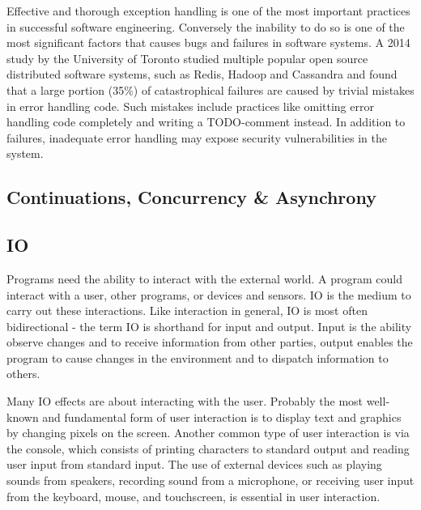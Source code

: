 Effective and thorough exception handling is one of the most important practices in successful software engineering. Conversely the inability to do so is one of the most significant factors that causes bugs and failures in software systems. A 2014 study by the University of Toronto studied multiple popular open source distributed software systems, such as Redis, Hadoop and Cassandra and found that a large portion (35\%) of catastrophical failures are caused by trivial mistakes in error handling code. Such mistakes include practices like omitting error handling code completely and writing a TODO-comment instead. In addition to failures, inadequate error handling may expose security vulnerabilities in the system.~\cite{simple-testing-failures}


\subsection{Continuations, Concurrency \& Asynchrony}


\subsection{IO}
Programs need the ability to interact with the external world.
A program could interact with a user, other programs, or devices and sensors. IO is the medium to carry out these interactions. Like interaction in general, IO is most often bidirectional - the term IO is shorthand for input and output. Input is the ability observe changes and to receive information from other parties, output enables the program to cause changes in the environment and to dispatch information to others.

Many IO effects are about interacting with the user. Probably the most well-known and fundamental form of user interaction is to display text and graphics by changing pixels on the screen. Another common type of user interaction is via the console, which consists of printing characters to standard output and reading user input from standard input. The use of external devices such as playing sounds from speakers, recording sound from a microphone, or receiving user input from the keyboard, mouse, and touchscreen, is essential in user interaction.

